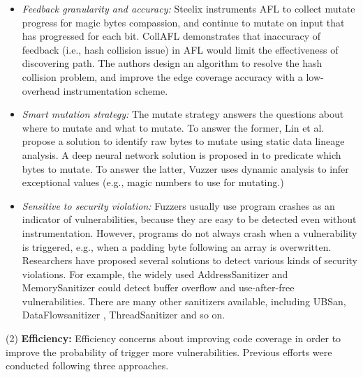 \begin{itemize}

\item  \textit{Feedback granularity and accuracy:} Steelix \cite{li2017steelix} instruments AFL to collect mutate progress for magic bytes compassion, and continue to mutate on input that has progressed for each bit. CollAFL \cite{gancollafl} demonstrates that inaccuracy of feedback (i.e., hash collision issue) in AFL would limit the effectiveness of discovering path. The authors design an algorithm to resolve the hash collision problem, and improve the edge coverage accuracy with a low-overhead instrumentation scheme.  

\item \textit{Smart mutation strategy:} The mutate strategy answers the questions about where to mutate and what to mutate. To answer the former, Lin et al.\cite{lin2008convicting} propose a solution to identify raw bytes to mutate using static data lineage analysis. A deep neural network solution is proposed in \cite{rajpal2017not} to predicate which bytes to mutate. To answer the latter, Vuzzer \cite{rawat2017vuzzer} uses dynamic analysis to infer exceptional values (e.g., magic numbers to use for mutating.) 

\item \textit{Sensitive to security violation:} Fuzzers usually use program crashes as an indicator of vulnerabilities, because they are easy to be detected even without instrumentation. However, programs do not always crash when a vulnerability is triggered, e.g., when a padding byte following an array is overwritten. Researchers have proposed several solutions to detect various kinds of security violations. For example, the widely used AddressSanitizer\cite{serebryany2012addresssanitizer} and MemorySanitizer\cite{stepanov2015memorysanitizer} could detect buffer overflow and use-after-free vulnerabilities. There are many other sanitizers available, including UBSan\cite{lee2015type}, DataFlowsanitizer \cite{DataFlowSanitizer}, ThreadSanitizer \cite{serebryany2009threadsanitizer} and so on.
\end{itemize}



(2) \textbf{Efficiency:} Efficiency concerns about improving code coverage in order to improve the probability of trigger more vulnerabilities. Previous efforts were conducted following three approaches.%


